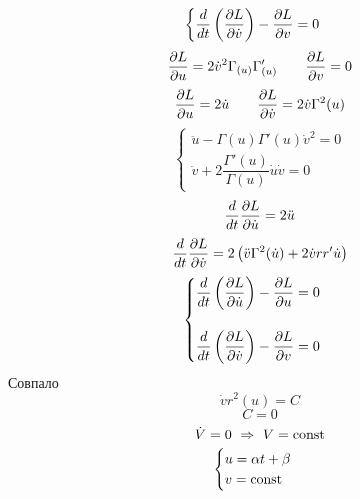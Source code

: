\documentclass[main]{sub\Phiiles}
\begin{document}
\begin{Sol}
\[\begin{cases}
            \dfrac{d}{dt} \left(\dfrac{\partial L}{\partial \dot{v}}\right) - \dfrac{\partial L}{\partial v} = 0
        \end{cases}\]
        \[\dfrac{\partial L}{\partial u} = 2 \dot{v}^2 \Gamma_{(u)} \Gamma_{(u)}' \qquad \dfrac{\partial L}{\partial v} = 0\]
        \[\dfrac{\partial L}{\partial u} = 2 \dot{u} \qquad \dfrac{\partial L}{\partial \dot{v}} = 2 \dot{v} \Gamma^2(u)\]
        \[\begin{cases}
            \ddot{u} - \Gamma(u) \Gamma'(u) \dot{v}^2 = 0\\
            \ddot{v} + 2 \dfrac{\Gamma'(u)}{\Gamma(u)} \dot{u} \dot{v} = 0
        \end{cases}\]
        \[\dfrac{d}{dt}\dfrac{\partial L}{\partial \dot{u}} = 2 \ddot{u}\]
        \[\dfrac{d}{dt}\dfrac{\partial L}{\partial \dot{v}} = 2 \left(\ddot{v} \Gamma^2(\dot{u}) + 2\dot{v} r r' \dot{u}\right)\]
        \[\begin{cases}
            \dfrac{d}{dt} \left(\dfrac{\partial L}{\partial \dot{u}}\right) - \dfrac{\partial L}{\partial u} = 0\\ \\
            \dfrac{d}{dt} \left(\dfrac{\partial L}{\partial \dot{v}}\right) - \dfrac{\partial L}{\partial v} = 0
        \end{cases}\]
        Совпало
        \[\dot{v} r^2 (u) = C\]
        \[C = 0\]
        \[\dot{V} = 0 \ \Rightarrow\  V = \mathop{\rm const}\nolimits\]
        \[\begin{cases}
            u = \alpha t + \beta\\
            v = \mathop{\rm const}\nolimits
        \end{cases}\]
    \end{Sol}
\end{document}
